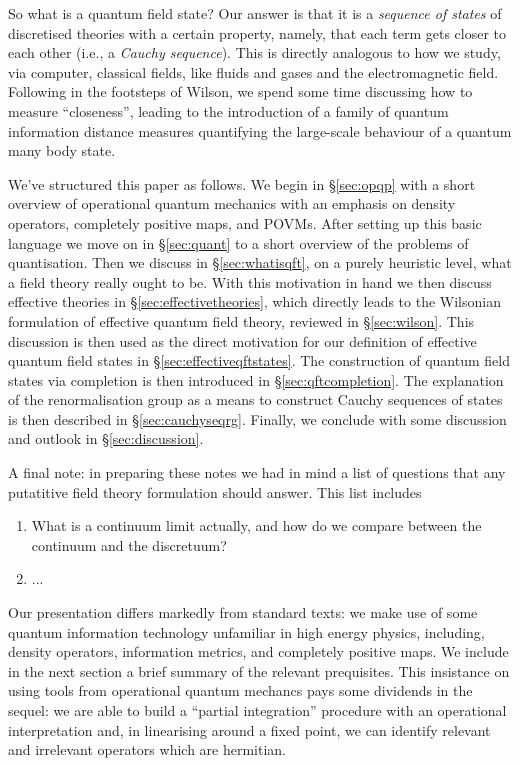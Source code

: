 \documentclass[11pt]{amsart}
\theoremstyle{plain}%
\theoremstyle{definition}
\theoremstyle{remark}
\begin{document}
So what is a quantum field state? Our answer is that it is a \emph{sequence of states} of discretised theories with a certain property, namely, that each term gets closer to each other (i.e., a \emph{Cauchy sequence}). This is directly analogous to how we study, via computer, classical fields, like fluids and gases and the electromagnetic field. Following in the footsteps of Wilson, we spend some time discussing how to measure ``closeness'', leading to the introduction of a family of quantum information distance measures quantifying the large-scale behaviour of a quantum many body state. 

We've structured this paper as follows. We begin in \S\ref{sec:opqp} with a short overview of operational quantum mechanics with an emphasis on density operators, completely positive maps, and POVMs. After setting up this basic language we move on in \S\ref{sec:quant} to a short overview of the problems of quantisation. Then we discuss in \S\ref{sec:whatisqft}, on a purely heuristic level, what a field theory really ought to be. With this motivation in hand we then discuss effective theories in \S\ref{sec:effectivetheories}, which directly leads to the Wilsonian formulation of effective quantum field theory, reviewed in \S\ref{sec:wilson}. This discussion is then used as the direct motivation for our definition of effective quantum field states in \S\ref{sec:effectiveqftstates}. The construction of quantum field states via completion is then introduced in \S\ref{sec:qftcompletion}. The explanation of the renormalisation group as a means to construct Cauchy sequences of states is then described in \S\ref{sec:cauchyseqrg}. Finally, we conclude with some discussion and outlook in \S\ref{sec:discussion}.

A final note: in preparing these notes we had in mind a list of questions that any putatitive field theory formulation should answer. This list includes
\begin{enumerate}
	\item What is a continuum limit actually, and how do we compare between the continuum and the discretuum?
	\item ...
\end{enumerate}
Our presentation differs markedly from standard texts: we make use of some quantum information technology unfamiliar in high energy physics, including, density operators, information metrics, and completely positive maps. We include in the next section a brief summary of the relevant prequisites. This insistance on using tools from operational quantum mechancs pays some dividends in the sequel: we are able to build a ``partial integration'' procedure with an operational interpretation and, in linearising around a fixed point, we can identify relevant and irrelevant operators which are hermitian.
\end{document}
